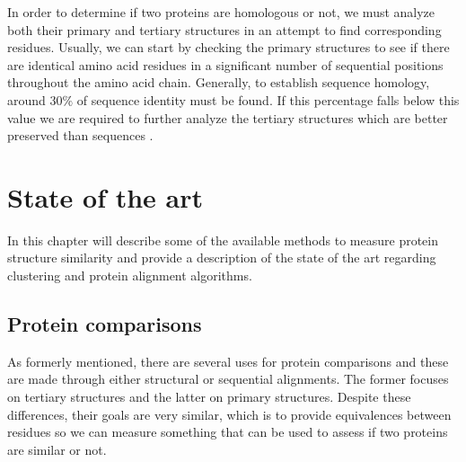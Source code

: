 In order to determine if two proteins are homologous or not, we must analyze both their primary and tertiary structures in an attempt to find corresponding residues. Usually, we can start by checking the primary structures to see if there are identical amino acid residues in a significant number of sequential positions throughout the amino acid chain. Generally, to establish sequence homology, around $30\%$ of sequence identity must be found. If this percentage falls below this value we are required to further analyze the tertiary structures which are better preserved than sequences \cite{pearson2013introduction}. 	
	
\chapter{State of the art}

In this chapter will describe some of the available methods to measure protein structure similarity and provide a description of the state of the art regarding clustering and protein alignment algorithms. 

\section{Protein comparisons} 

As formerly mentioned, there are several uses for protein comparisons and these are made through either structural or sequential alignments. The former focuses on tertiary structures and the latter on primary structures. Despite these differences, their goals are very similar, which is to provide equivalences between residues so we can measure something that can be used to assess if two proteins are similar or not.

